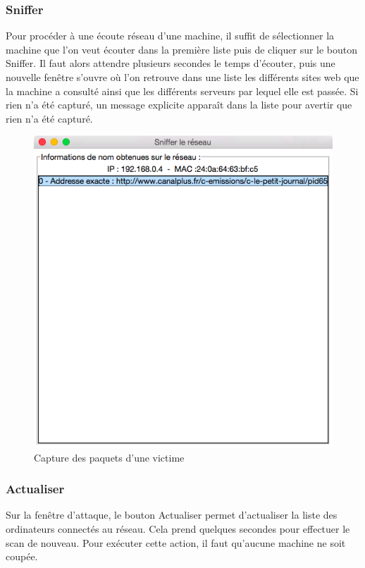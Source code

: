 \documentclass[11pt]{article}
\begin{document}
\subsubsection{Sniffer}
Pour procéder à une écoute réseau d'une machine, il suffit de sélectionner la machine que l'on veut écouter dans la première liste puis de cliquer sur le bouton Sniffer. Il faut alors attendre plusieurs secondes le temps d'écouter, puis une nouvelle fenêtre s'ouvre où l'on retrouve dans une liste les différents sites web que la machine a consulté ainsi que les différents serveurs par lequel elle est passée. Si rien n'a été capturé, un message explicite apparaît dans la liste pour avertir que rien n'a été capturé.
\begin{figure}[!h]
\centering
\includegraphics[scale=0.5]{./Captures/sniffFen.png}
\caption{Capture des paquets d'une victime}
\end{figure}

\subsubsection{Actualiser}
Sur la fenêtre d'attaque, le bouton Actualiser permet d'actualiser la liste des ordinateurs connectés au réseau. Cela prend quelques secondes pour effectuer le scan de nouveau. Pour exécuter cette action, il faut qu'aucune machine ne soit coupée.
\end{document}
